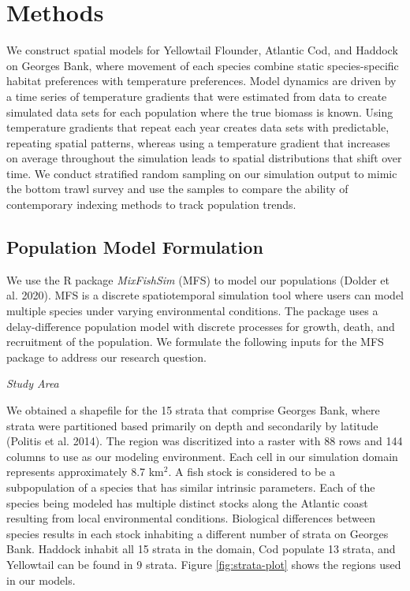 \documentclass[
  12pt,
]{article}
\begin{document}
\section{Methods}

We construct spatial models for Yellowtail Flounder, Atlantic Cod, and Haddock on Georges Bank, where movement of each species combine static species-specific habitat preferences with temperature preferences. Model dynamics are driven by a time series of temperature gradients that were estimated from data to create simulated data sets for each population where the true biomass is known. Using temperature gradients that repeat each year creates data sets with predictable, repeating spatial patterns, whereas using a temperature gradient that increases on average throughout the simulation leads to spatial distributions that shift over time. We conduct stratified random sampling on our simulation output to mimic the bottom trawl survey and use the samples to compare the ability of contemporary indexing methods to track population trends.

\subsection{Population Model Formulation}

We use the R package \emph{MixFishSim} (MFS) to model our populations (Dolder et al. 2020). MFS is a discrete spatiotemporal simulation tool where users can model multiple species under varying environmental conditions. The package uses a delay-difference population model with discrete processes for growth, death, and recruitment of the population. We formulate the following inputs for the MFS package to address our research question.

\emph{Study Area}

We obtained a shapefile for the 15 strata that comprise Georges Bank, where strata were partitioned based primarily on depth and secondarily by latitude (Politis et al. 2014). The region was discritized into a raster with 88 rows and 144 columns to use as our modeling environment. Each cell in our simulation domain represents approximately 8.7 km\(^2\). A fish stock is considered to be a subpopulation of a species that has similar intrinsic parameters. Each of the species being modeled has multiple distinct stocks along the Atlantic coast resulting from local environmental conditions. Biological differences between species results in each stock inhabiting a different number of strata on Georges Bank. Haddock inhabit all 15 strata in the domain, Cod populate 13 strata, and Yellowtail can be found in 9 strata. Figure \ref{fig:strata-plot} shows the regions used in our models.
\end{document}
